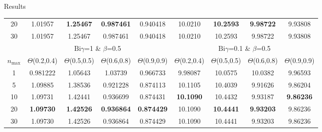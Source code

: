 \documentclass[english,landscape,xcolor=dvipsnames,aspectratio=169]{beamer}
\newcommand{\Bi}{\mathrm{Bi}}
\newcommand{\nmax}{n_{\max}}
\begin{document}
\begin{frame}{Results}
\begin{table}[h!]
\begin{tabular}{|c|c|c|c|c|c|c|c|c|}
		20 & 1.01957 &  \bfseries 1.25467 &  \bfseries 0.987461 & 0.940418 & 10.0210 &  \bfseries 10.2593 & \bfseries  9.98722 & 9.93808 \\
		30 & 1.01957 & 1.25467 & 0.987461 & 0.940418 & 10.0210 & 10.2593 & 9.98722 & 9.93808 \\
		\hline
		&\multicolumn{4}{|c|}{$\Bi\gamma$=1 \& $\beta$=0.5} & \multicolumn{4}{c|}{$\Bi\gamma$=0.1 \& $\beta$=0.5}\\ \hline
		$\nmax$ & $\Theta$(0.2,0.4)& $\Theta$(0.5,0.5)&  $\Theta$(0.6,0.8)& $\Theta$(0.9,0.9)  & $\Theta$(0.2,0.4)& $\Theta$(0.5,0.5)&  $\Theta$(0.6,0.8)& $\Theta$(0.9,0.9)\\\hline
		1 & 0.981222 & 1.05643 & 1.03739 & 0.966733 & 9.98087 & 10.0575 & 10.0382 & 9.96593 \\
		5 & 1.09885 & 1.38536 & 0.921228 & 0.874113  & 10.1105 & 10.4039 & 9.91626 & 9.86204 \\
		10 & 1.09731 & 1.42441 & 0.936699 & 0.874431  &  \bfseries 10.1090 & 10.4432 & 9.93187 &  \bfseries 9.86236 \\
		20 &  \bfseries 1.09730 &  \bfseries 1.42526 &  \bfseries 0.936864 &  \bfseries 0.874429 & 10.1090 &  \bfseries 10.4441 &  \bfseries 9.93203 & 9.86236 \\
		30 & 1.09730 & 1.42526 & 0.936864 & 0.874429 & 10.1090 & 10.4441 & 9.93203 & 9.86236 \\
		\hline
	\end{tabular}
\end{table} 
\end{frame}
\end{document}
